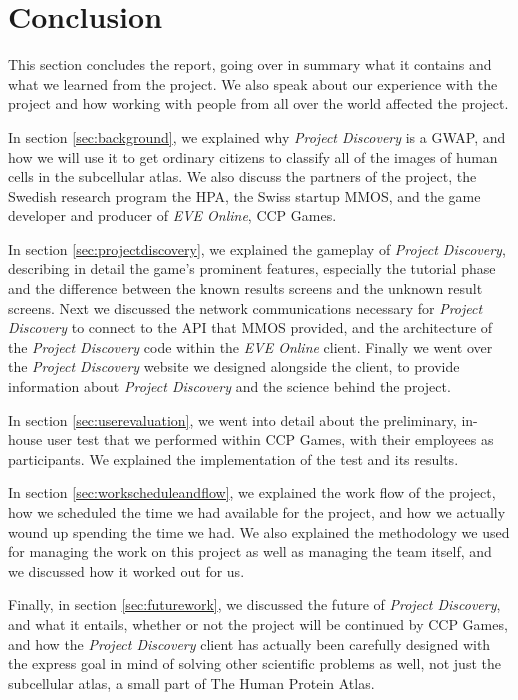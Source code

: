 \section{Conclusion}\label{sec:conclusion}

This section concludes the report, going over in summary what it contains and what we learned from the project. We also speak about our experience with the project and how working with people from all over the world affected the project. 

In section \ref{sec:background}, we explained why \emph{Project Discovery} is a GWAP, and how we will use it to get ordinary citizens to classify all of the images of human cells in the subcellular atlas. We also discuss the partners of the project, the Swedish research program the HPA, the Swiss startup MMOS, and the game developer and producer of \emph{EVE Online}, CCP Games.

In section \ref{sec:projectdiscovery}, we explained the gameplay of \emph{Project Discovery}, describing in detail the game's prominent features, especially the tutorial phase and the difference between the known results screens and the unknown result screens. Next we discussed the network communications necessary for \emph{Project Discovery} to connect to the API that MMOS provided, and the architecture of the \emph{Project Discovery} code within the \emph{EVE Online} client. Finally we went over the \emph{Project Discovery} website we designed alongside the client, to provide information about \emph{Project Discovery} and the science behind the project.

In section \ref{sec:userevaluation}, we went into detail about the preliminary, in-house user test that we performed within CCP Games, with their employees as participants. We explained the implementation of the test and its results.

In section \ref{sec:workscheduleandflow}, we explained the work flow of the project, how we scheduled the time we had available for the project, and how we actually wound up spending the time we had. We also explained the methodology we used for managing the work on this project as well as managing the team itself, and we discussed how it worked out for us.

Finally, in section \ref{sec:futurework}, we discussed the future of \emph{Project Discovery}, and what it entails, whether or not the project will be continued by CCP Games, and how the \emph{Project Discovery} client has actually been carefully designed with the express goal in mind of solving other scientific problems as well, not just the subcellular atlas, a small part of The Human Protein Atlas.

